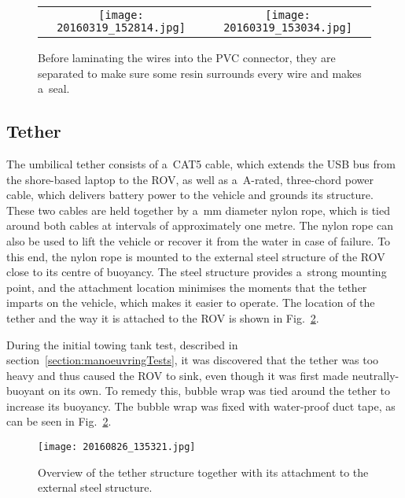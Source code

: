 \begin{figure}[htb]
\begin{center}
\begin{tabular}{c c}
	\texttt{[image: 20160319\_152814.jpg]} & \texttt{[image: 20160319\_153034.jpg]} \\
\end{tabular}
\end{center}
\caption{Before laminating the wires into the PVC connector, they are separated to make sure some resin surrounds every wire and makes a~seal.}
\label{fig:separatingTheWires}
\end{figure}

\clearpage %

\subsection{Tether}\label{ssection:tether}
The umbilical tether consists of a~CAT5 cable, which extends the USB bus from the shore-based laptop to the ROV, as well as a~\unit[16]{A}-rated, three-chord power cable, which delivers battery power to the vehicle and grounds its structure. These two cables are held together by a~\unit[6]{mm} diameter nylon rope, which is tied around both cables at intervals of approximately one metre. The nylon rope can also be used to lift the vehicle or recover it from the water in case of failure. To this end, the nylon rope is mounted to the external steel structure of the ROV close to its centre of buoyancy. The steel structure provides a~strong mounting point, and the attachment location minimises the moments that the tether imparts on the vehicle, which makes it easier to operate. The location of the tether and the way it is attached to the ROV is shown in Fig.~\ref{fig:thetherOverview}.

During the initial towing tank test, described in section~\ref{section:manoeuvringTests}, it was discovered that the tether was too heavy and thus caused the ROV to sink, even though it was first made neutrally-buoyant on its own. To remedy this, bubble wrap was tied around the tether to increase its buoyancy. The bubble wrap was fixed with water-proof duct tape, as can be seen in Fig.~\ref{fig:thetherOverview}.

\begin{figure}[htb]
\begin{minipage}[b]{1\linewidth}
  \centering
	\texttt{[image: 20160826\_135321.jpg]}
\end{minipage}
\caption{Overview of the tether structure together with its attachment to the external steel structure.}
\label{fig:thetherOverview}
\end{figure}

\clearpage %
